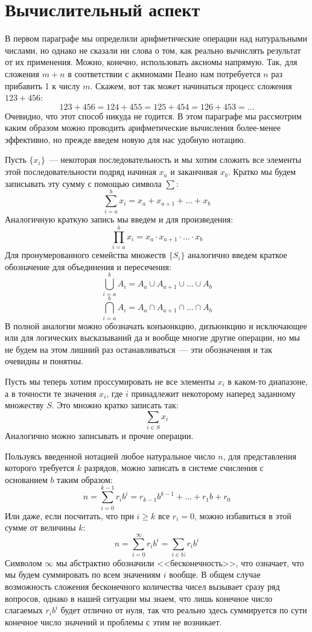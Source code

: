 \section{Вычислительный аспект}

В первом параграфе мы определили арифметические операции над натуральными числами, но однако не сказали ни слова о том, как реально вычислять результат от их применения. Можно, конечно, использовать аксиомы напрямую. Так, для сложения $m+n$ в соответствии с акмиомами Пеано нам потребуется $n$ раз прибавить 1 к числу $m$. Скажем, вот так может начинаться процесс сложения $123+456$:
$$123+456 = 124 + 455 = 125 + 454 = 126 + 453 = \ldots$$
Очевидно, что этот способ никуда не годится. В этом параграфе мы рассмотрим каким образом можно проводить арифметические вычисления более-менее эффективно, но прежде введем новую для нас удобную нотацию.

Пусть $\{x_i\}$~--- некоторая последовательность и мы хотим сложить все элементы этой последовательности подряд начиная $x_a$ и заканчивая $x_b$. Кратко мы будем записывать эту сумму с помощью символа $\sum$:
$$\sum_{i=a}^b x_i = x_a + x_{a+1} + \ldots + x_b$$
Аналогичную краткую запись мы введем и для произведения:
$$\prod_{i=a}^b x_i = x_a \cdot x_{a+1} \cdot \ldots \cdot x_b$$
Для пронумерованного семейства множеств $\{S_i\}$ аналогично введем краткое обозначение для объединения и пересечения:
$$\bigcup_{i=a}^b A_i = A_a \cup A_{a+1}\cup\ldots\cup A_b$$
$$\bigcap_{i=a}^b A_i = A_a \cap A_{a+1}\cap\ldots\cap A_b$$
В полной аналогии можно обозначать конъюнкцию, дизъюнкцию и исключающее или  для логических высказываний да и вообще многие другие операции, но мы не будем на этом лишний раз останавливаться~--- эти обозначения и так очевидны и понятны.

Пусть мы теперь хотим проссумировать не все элементы $x_i$ в каком-то диапазоне, а в точности те значения $x_i$, где $i$ принадлежит некоторому наперед заданному множеству $S$. Это множно кратко записать так:
$$\sum_{i\in S} x_i$$
Аналогично можно записывать и прочие операции.

Пользуясь введенной нотацией любое натуральное число $n$, для представления которого требуется $k$ разрядов, можно записать в системе счисления с основанием $b$ таким образом:
$$n = \sum_{i=0}^{k-1} r_i b^i = r_{k - 1} b^{k-1} + \ldots + r_1 b + r_0$$
Или даже, если посчитать, что при $i\ge k$ все $r_i = 0$, можно избавиться в этой сумме от величины $k$:
$$n = \sum_{i=0}^\infty r_i b^i = \sum_{i\in\mathbb{N}} r_i b^i$$
Символом $\infty$ мы абстрактно обозначили <<бесконечность>>, что означает, что мы будем суммировать по всем значениям $i$ вообще. В общем случае возможность сложения бесконечного количества чисел вызывает сразу ряд вопросов, однако в нашей ситуации мы знаем, что лишь конечное число слагаемых $r_ib^i$ будет отлично от нуля, так что реально здесь суммируется по сути конечное число значений и проблемы с этим не возникает.


